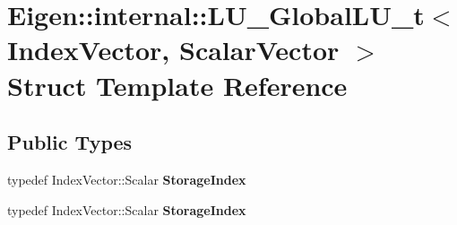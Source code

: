 \hypertarget{struct_eigen_1_1internal_1_1_l_u___global_l_u__t}{}\section{Eigen\+:\+:internal\+:\+:L\+U\+\_\+\+Global\+L\+U\+\_\+t$<$ Index\+Vector, Scalar\+Vector $>$ Struct Template Reference}
\label{struct_eigen_1_1internal_1_1_l_u___global_l_u__t}
\subsection*{Public Types}
\begin{DoxyCompactItemize}
\item 
\mbox{\label{struct_eigen_1_1internal_1_1_l_u___global_l_u__t_a96818e6cada6723e24e9f7b218c446b3}} 
typedef Index\+Vector\+::\+Scalar {\bfseries Storage\+Index}
\item 
\mbox{\label{struct_eigen_1_1internal_1_1_l_u___global_l_u__t_a96818e6cada6723e24e9f7b218c446b3}} 
typedef Index\+Vector\+::\+Scalar {\bfseries Storage\+Index}
\end{DoxyCompactItemize}

